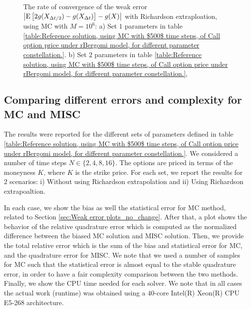 \begin{figure}[h!]
	\caption{The rate of convergence of the weak error  $\left\lvert\mathrm{E}\left[2 g(X_{\Delta t/2}) -g(X_{\Delta t})\right]-g(X)\right\rvert$   with Richardson extraploation, using MC with $M=10^6$: a) Set $1$ parameters in table \ref{table:Reference solution, using MC with $500$ time steps, of Call option price under rBergomi model, for different parameter constellation.}.  b) Set $2$ parameters in table \ref{table:Reference solution, using MC with $500$ time steps, of Call option price under rBergomi model, for different parameter constellation.}, }
	\label{fig:Weak_rate_H_043_007_with_rich}
\end{figure}


\FloatBarrier





\subsection{Comparing different  errors and complexity for MC and MISC}\label{sec:Comparing different  errors and complexity for MC and MISC}


The results were reported for the different sets of parameters defined in table \ref{table:Reference solution, using MC with $500$ time steps, of Call option price under rBergomi model, for different parameter constellation.}. We considered   a number of time steps $N \in \{2,4,8,16\}$.  The options are priced in terms of the moneyness $K$, where $K$ is the strike price.  For each set,  we report the results for $2$ scenarios: i) Without using Richardson extrapolation and  ii) Using  Richardson extrapoaltion.

In each case, we show the bias as well the statistical error for MC method, related to Section \ref{sec:Weak error plots_no_change}. After that, a plot  shows the behavior of  the relative quadrature error which is computed as the normalized difference between the biased MC solution and MISC solution. Then, we provide the total relative error which is the sum of the bias and statistical error for MC, and the quadrature error for MISC. We note that we used a number of samples for MC such that the statistical error is almost equal to the stable quadrature error, in order to have a fair complexity comparison between the two methods. Finally, we show the CPU time needed for each solver. We note that  in all cases the actual work (runtime) was obtained using a $40$-core Intel(R) Xeon(R) CPU E5-268 architecture.

